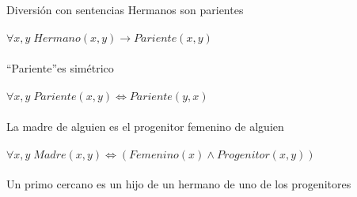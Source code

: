 \begin{frame}{Diversión con sentencias}
Hermanos son parientes
\\~\\
\noindent\textcolor{DarkPurple}{$\forall x,y \; Hermano(x,y) \rightarrow Pariente(x,y)$}
\\~\\
{``Pariente''}es simétrico
\\~\\
\noindent\textcolor{DarkPurple}{$\forall x,y \; Pariente(x,y) \iff Pariente(y,x)$}
\\~\\
La madre de alguien es el progenitor femenino de alguien
\\~\\
\noindent\textcolor{DarkPurple}{$\forall x,y \; Madre(x,y) \iff (Femenino(x) \land Progenitor(x,y))$}
\\~\\
Un primo cercano es un hijo de un hermano de uno de los	progenitores
\end{frame}